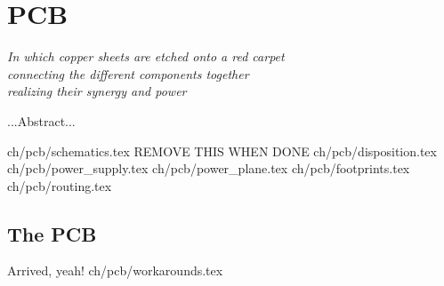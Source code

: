\chapter {PCB}

\begin {flushright} {\slshape
    In which copper sheets are etched onto a red carpet\\
    connecting the different components together\\
    realizing their synergy and power
}
\end {flushright}
...Abstract...

 {ch/pcb/schematics.tex}
REMOVE THIS WHEN DONE
 {ch/pcb/disposition.tex}
 {ch/pcb/power_supply.tex}
 {ch/pcb/power_plane.tex}
 {ch/pcb/footprints.tex}
 {ch/pcb/routing.tex}
\section {The PCB}
Arrived, yeah!
 {ch/pcb/workarounds.tex}
